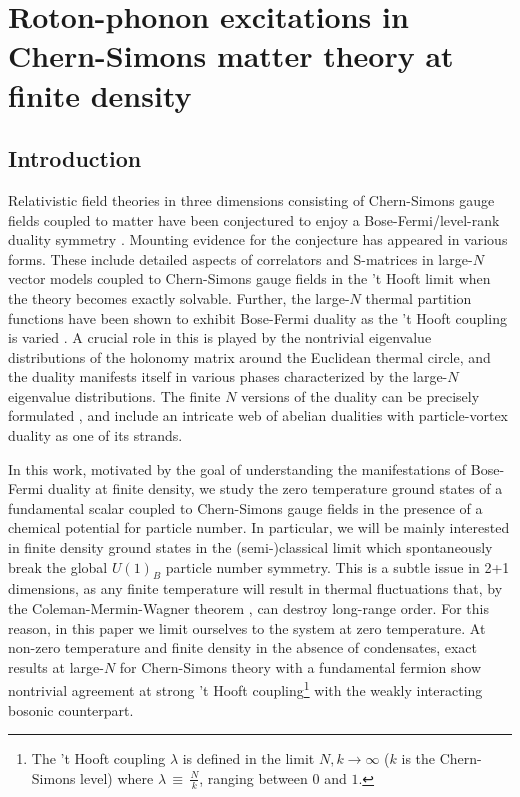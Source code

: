 \chapter{Roton-phonon excitations in Chern-Simons matter theory at finite density}
\label{ch:Chapter_3}
    \graphicspath{{Chapter_3_Folder/figures/PNG/}{Chapter_3_Folder/figures/PDF/}{Chapter_3_Folder/figures/}}

\section{Introduction}
Relativistic field theories in three dimensions consisting of Chern-Simons gauge fields coupled to matter have been conjectured to enjoy a Bose-Fermi/level-rank duality symmetry \cite{Giombi:2011kc}. Mounting evidence for the conjecture has appeared in various forms. These include detailed aspects of  correlators \cite{Giombi:2011kc, Aharony:2011jz, Maldacena:2011jn, Maldacena:2012sf, Aharony:2012nh} and S-matrices \cite{Jain:2014nza, Dandekar:2014era} in large-$N$ vector models coupled to Chern-Simons gauge fields in the 't Hooft limit when the theory  becomes exactly solvable. 
Further, the large-$N$ thermal partition functions have been shown to exhibit Bose-Fermi duality as the 't Hooft coupling is varied \cite{Giombi:2011kc, Aharony:2012ns,Jain:2013py, Jain:2013gza, Takimi:2013zca}.  A crucial role in this is played by the nontrivial eigenvalue distributions of the holonomy matrix around the Euclidean thermal circle, and the duality manifests itself in various phases characterized by the large-$N$ eigenvalue distributions. The  finite $N$ versions of the duality can be precisely formulated \cite{Aharony:2015mjs}, and include an intricate web of abelian dualities \cite{Seiberg:2016gmd, Karch:2016sxi, Murugan:2016zal} with particle-vortex duality as one of its strands.

 In this work, motivated by the goal of understanding the manifestations of Bose-Fermi duality at finite density, we  study the zero temperature ground states of a fundamental scalar coupled to Chern-Simons gauge fields in the presence of a chemical potential for particle number. In particular, we will be mainly interested in finite density ground states in the (semi-)classical limit which spontaneously break the global $U(1)_B$ particle number symmetry. This is a subtle issue in 2+1 dimensions, as any finite temperature will result in thermal fluctuations that, by the Coleman-Mermin-Wagner theorem \cite{Coleman:1973ci, Mermin:1966fe}, can  destroy long-range order. 
 For this reason, in this paper we limit ourselves to the system at zero temperature. 
 At  non-zero temperature and finite density in the absence of condensates,  exact results at large-$N$ for Chern-Simons theory with a fundamental fermion \cite{Geracie:2015drf, Gur-Ari:2016xff} show nontrivial agreement at strong 't Hooft coupling\footnote{The 't Hooft coupling $\lambda$ is defined in the limit $N,k\to\infty$  ($k$ is the Chern-Simons level) where $\lambda \,\equiv\,\frac{N}{k}$, ranging between $0$ and $1$. } with the weakly interacting bosonic counterpart.
 
